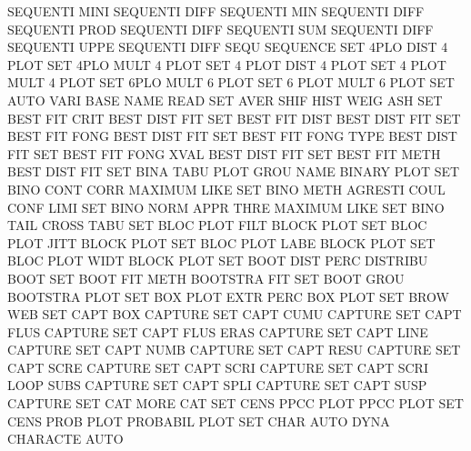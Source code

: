 SEQUENTI MINI                           SEQUENTI DIFF
SEQUENTI MIN                            SEQUENTI DIFF
SEQUENTI PROD                           SEQUENTI DIFF
SEQUENTI SUM                            SEQUENTI DIFF
SEQUENTI UPPE                           SEQUENTI DIFF
SEQU                                    SEQUENCE
SET      4PLO DIST                      4        PLOT
SET      4PLO MULT                      4        PLOT
SET      4    PLOT DIST                 4        PLOT
SET      4    PLOT MULT                 4        PLOT
SET      6PLO MULT                      6        PLOT
SET      6    PLOT MULT                 6        PLOT
SET      AUTO VARI BASE NAME            READ
SET      AVER SHIF HIST WEIG            ASH
SET      BEST FIT  CRIT                 BEST     DIST FIT
SET      BEST FIT  DIST                 BEST     DIST FIT
SET      BEST FIT  FONG                 BEST     DIST FIT
SET      BEST FIT  FONG TYPE            BEST     DIST FIT
SET      BEST FIT  FONG XVAL            BEST     DIST FIT
SET      BEST FIT  METH                 BEST     DIST FIT
SET      BINA TABU PLOT GROU NAME       BINARY   PLOT
SET      BINO CONT CORR                 MAXIMUM  LIKE
SET      BINO METH                      AGRESTI  COUL CONF LIMI
SET      BINO NORM APPR THRE            MAXIMUM  LIKE
SET      BINO TAIL                      CROSS    TABU
SET      BLOC PLOT FILT                 BLOCK    PLOT
SET      BLOC PLOT JITT                 BLOCK    PLOT
SET      BLOC PLOT LABE                 BLOCK    PLOT
SET      BLOC PLOT WIDT                 BLOCK    PLOT
SET      BOOT DIST PERC                 DISTRIBU BOOT
SET      BOOT FIT  METH                 BOOTSTRA FIT
SET      BOOT GROU                      BOOTSTRA PLOT
SET      BOX  PLOT EXTR PERC            BOX      PLOT
SET      BROW                           WEB
SET      CAPT BOX                       CAPTURE
SET      CAPT CUMU                      CAPTURE
SET      CAPT FLUS                      CAPTURE
SET      CAPT FLUS ERAS                 CAPTURE
SET      CAPT LINE                      CAPTURE
SET      CAPT NUMB                      CAPTURE
SET      CAPT RESU                      CAPTURE
SET      CAPT SCRE                      CAPTURE
SET      CAPT SCRI                      CAPTURE
SET      CAPT SCRI LOOP SUBS            CAPTURE
SET      CAPT SPLI                      CAPTURE
SET      CAPT SUSP                      CAPTURE
SET      CAT  MORE                      CAT
SET      CENS PPCC PLOT                 PPCC     PLOT
SET      CENS PROB PLOT                 PROBABIL PLOT
SET      CHAR AUTO DYNA                 CHARACTE AUTO
